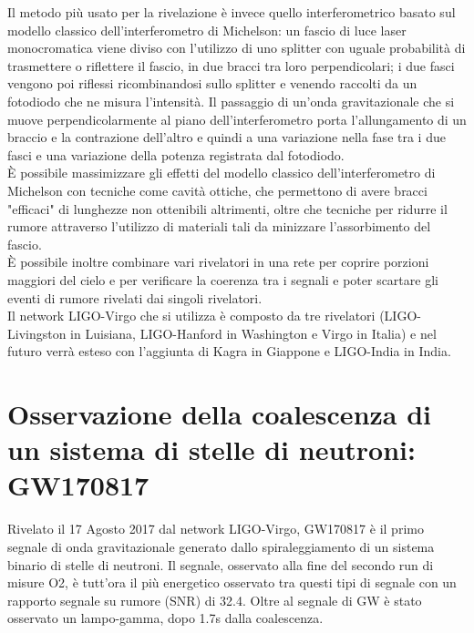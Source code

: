Il metodo più usato per la rivelazione è invece quello interferometrico basato sul modello classico dell'interferometro di Michelson: un fascio di luce laser monocromatica viene diviso con l'utilizzo di uno splitter con uguale probabilità di trasmettere o riflettere il fascio, in due bracci tra loro perpendicolari; i due fasci vengono poi riflessi ricombinandosi sullo splitter e venendo raccolti da un fotodiodo che ne misura l'intensità. Il passaggio di un'onda gravitazionale che si muove perpendicolarmente al piano dell'interferometro porta l'allungamento di un braccio e la contrazione dell'altro e quindi a una variazione nella fase tra i due fasci e una variazione della potenza registrata dal fotodiodo.\\
È possibile massimizzare gli effetti del modello classico dell'interferometro di Michelson con tecniche come cavità ottiche, che permettono di avere bracci "efficaci" di lunghezze non ottenibili altrimenti, oltre che tecniche per ridurre il rumore attraverso l'utilizzo di materiali tali da minizzare l'assorbimento del fascio.\\
È possibile inoltre combinare vari rivelatori in una rete per coprire porzioni maggiori del cielo e per verificare la coerenza tra i segnali e poter scartare gli eventi di rumore rivelati dai singoli rivelatori.\\
Il network LIGO-Virgo che si utilizza è composto da tre rivelatori (LIGO-Livingston in Luisiana, LIGO-Hanford in Washington e Virgo in Italia) e nel futuro verrà esteso con l'aggiunta di Kagra in Giappone e LIGO-India in India.
\section{Osservazione della coalescenza di un sistema di stelle di neutroni: GW170817}
\label{section:osservazioneInspiralGW170817}
Rivelato il 17 Agosto 2017 dal network LIGO-Virgo, GW170817 è il primo segnale di onda gravitazionale generato dallo spiraleggiamento di un sistema binario di stelle di neutroni.
Il segnale, osservato alla fine del secondo run di misure O2, è tutt'ora il più energetico osservato tra questi tipi di segnale con un rapporto segnale su rumore (SNR) di 32.4.
Oltre al segnale di GW è stato osservato un lampo-gamma, dopo 1.7s dalla coalescenza.

